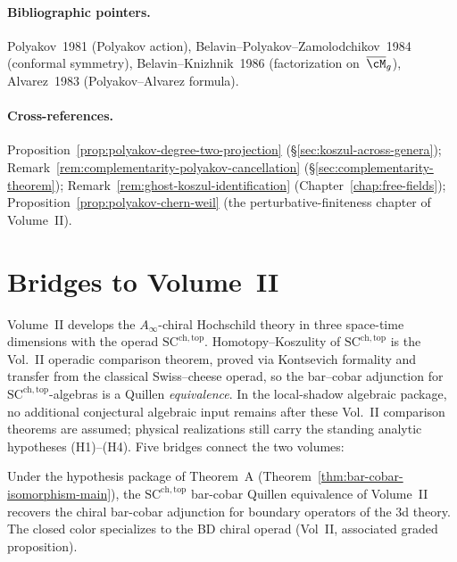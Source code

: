 \paragraph{Bibliographic pointers.}
Polyakov~1981 (Polyakov action),
Belavin--Polyakov--Zamolodchikov~1984 (conformal symmetry),
Belavin--Knizhnik~1986 (factorization on~$\overline{\cM}_g$),
Alvarez~1983 (Polyakov--Alvarez formula).

\paragraph{Cross-references.}
Proposition~\ref{prop:polyakov-degree-two-projection}
(\S\ref{sec:koszul-across-genera});
Remark~\ref{rem:complementarity-polyakov-cancellation}
(\S\ref{sec:complementarity-theorem});
Remark~\ref{rem:ghost-koszul-identification}
(Chapter~\ref{chap:free-fields});
Proposition~\ref{prop:polyakov-chern-weil}
(the perturbative-finiteness chapter of Volume~II).


\section{Bridges to Volume~II}
\label{sec:cross-volume-bridges}

Volume~II develops the $A_\infty$-chiral Hochschild theory in
three space-time dimensions with the operad
$\mathrm{SC}^{\mathrm{ch,top}}$. Homotopy--Koszulity of
$\mathrm{SC}^{\mathrm{ch,top}}$ is the Vol.~II operadic comparison
theorem, proved via Kontsevich formality and transfer from the classical
Swiss--cheese operad, so the bar--cobar adjunction for
$\mathrm{SC}^{\mathrm{ch,top}}$-algebras is a Quillen
\emph{equivalence}. In the local-shadow algebraic package, no
additional conjectural algebraic input remains after these Vol.~II
comparison theorems are assumed; physical realizations still carry the
standing analytic hypotheses (H1)--(H4).
Five bridges connect the two volumes:

\begin{proposition}
\label{prop:vol2-bar-cobar-bridge}%
Under the hypothesis package of Theorem~A
(Theorem~\ref{thm:bar-cobar-isomorphism-main}), the
$\mathrm{SC}^{\mathrm{ch,top}}$ bar-cobar Quillen equivalence of
Volume~II recovers the chiral bar-cobar adjunction for boundary
operators of the 3d theory. The closed color specializes to the BD
chiral operad (Vol~II, associated graded proposition).
\end{proposition}

